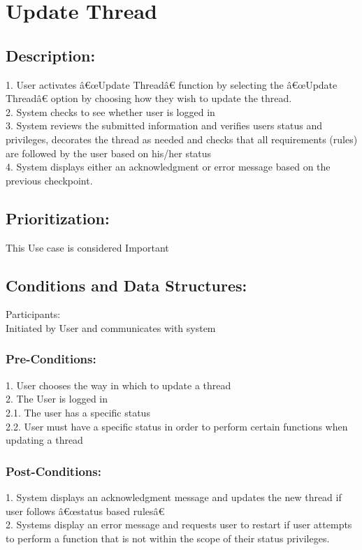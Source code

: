 \documentclass[a4paper,11pt]{article}
\begin{document}
\section{Update Thread}
\subsection*{Description:}
1.	User activates â€œUpdate Threadâ€ function by selecting the â€œUpdate Threadâ€ option by choosing how they wish to update the thread.\\
2.	System checks to see whether user is logged in\\
3.	System reviews the submitted information and  verifies users status and privileges, decorates the thread as needed and checks that all requirements (rules) are followed by the user based on his/her status\\
4.	 System displays either an acknowledgment or error message based on the previous checkpoint.\\

\subsection{Prioritization:} 
This Use case is considered Important\\
\subsection{Conditions and Data Structures:}
Participants:\\
Initiated by User and communicates with system\\
\subsubsection*{Pre-Conditions:}
1.	User chooses the way in which to update a thread\\
2.	The User is logged in \\
2.1.	The user has a specific status\\
2.2.	User must have a specific status in order to perform certain functions when updating a thread\\
\subsubsection*{Post-Conditions:}
1.	System displays an acknowledgment message and updates  the new thread  if user follows â€œstatus based rulesâ€\\
2.	Systems display an error message and requests user to restart if user attempts to perform a function that is not within the scope of their status privileges.\\
\end{document}
